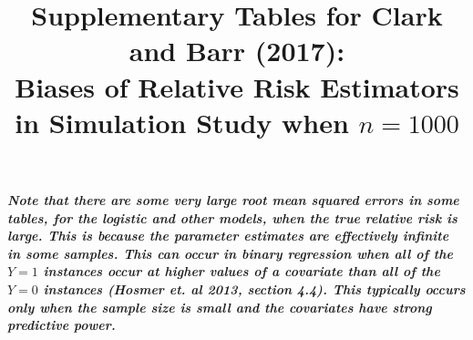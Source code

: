 \documentclass[12pt,a4paper]{article}
\date{}
\begin{document}
\title{Supplementary Tables for Clark and Barr (2017):  \\  
Biases of Relative Risk Estimators in Simulation Study when $n=1000$ }


\maketitle



{\bf \it Note that there are some very large root mean squared errors in some tables, for the logistic and other models, when the true relative risk is large. This is because the parameter estimates are effectively infinite in some samples. This can occur in binary regression when all of the $Y=1$ instances occur at higher values of a covariate than all of the $Y=0$ instances (Hosmer et. al 2013, section 4.4). This typically occurs only when the sample size is small and the covariates have strong predictive power.}
\end{document}
